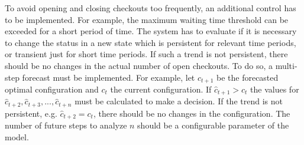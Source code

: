 To avoid opening and closing checkouts too frequently, an additional control has to be implemented. For example, the maximum waiting time threshold can be exceeded for a short period of time. The system has to evaluate if it is necessary to change the status in a new state which is persistent for relevant time periods, or transient just for short time periods. If such a trend is not persistent, there should be no changes in the actual number of open checkouts.
To do so, a multi-step forecast must be implemented. For example, let $ \hat{c}_{t+1} $ be the forecasted optimal configuration and $ c_t $ the current configuration. If $ \hat{c}_{t+1} > c_t $ the values for $ \hat{c}_{t+2}, \hat{c}_{t+3}, ..., \hat{c}_{t+n} $ must be calculated to make a decision. If the trend is not persistent, e.g. $ \hat{c}_{t+2} = c_t $, there should be no changes in the configuration. The number of future steps to analyze $ n $ should be a configurable parameter of the model.


\clearpage
